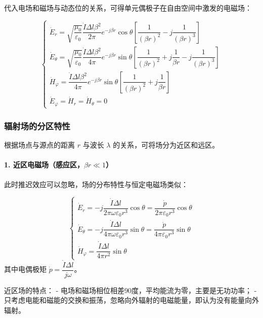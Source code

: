 代入电场和磁场与动态位的关系，可得单元偶极子在自由空间中激发的电磁场：
\begin{formulaBox}
\[
\begin{cases}
\dot{E}_r = \sqrt{\dfrac{\mu_0}{\varepsilon_0}} \dfrac{\dot{I} \Delta l \beta^2}{2\pi} e^{-j\beta r} \cos\theta \left[ \dfrac{1}{(\beta r)^2} - j\dfrac{1}{(\beta r)^3} \right] \\[6pt]
\dot{E}_\theta = \sqrt{\dfrac{\mu_0}{\varepsilon_0}} \dfrac{\dot{I} \Delta l \beta^2}{4\pi} e^{-j\beta r} \sin\theta \left[ \dfrac{1}{(\beta r)^2} + j\dfrac{1}{\beta r} - j\dfrac{1}{(\beta r)^3} \right] \\[6pt]
\dot{H}_\varphi = \dfrac{\dot{I} \Delta l \beta^2}{4\pi} e^{-j\beta r} \sin\theta \left[ \dfrac{1}{(\beta r)^2} + j\dfrac{1}{\beta r} \right] \\[6pt]
\dot{E}_\varphi = \dot{H}_r = \dot{H}_\theta = 0
\end{cases}
\]
\end{formulaBox}

\subsubsection{辐射场的分区特性}
根据场点与源点的距离 $r$ 与波长 $\lambda$ 的关系，可将场分为近区和远区。

\paragraph{1. 近区电磁场（感应区，$\beta r \ll 1$）}
此时推迟效应可以忽略，场的分布特性与恒定电磁场类似：
\begin{formulaBox}
\[
\begin{cases}
\dot{E}_r = -j\dfrac{\dot{I} \Delta l}{2\pi\omega\varepsilon_0 r^3} \cos\theta = \dfrac{\dot{p}}{2\pi\varepsilon_0 r^3} \cos\theta \\[6pt]
\dot{E}_\theta = -j\dfrac{\dot{I} \Delta l}{4\pi\omega\varepsilon_0 r^3} \sin\theta = \dfrac{\dot{p}}{4\pi\varepsilon_0 r^3} \sin\theta \\[6pt]
\dot{H}_\varphi = \dfrac{\dot{I} \Delta l}{4\pi r^2} \sin\theta
\end{cases}
\]
其中电偶极矩 $\dot{p} = \dfrac{\dot{I} \Delta l}{j\omega}$。
\end{formulaBox}

近区场的特点：
- 电场和磁场相位相差90度，平均能流为零，主要是无功功率；
- 只考虑电能和磁能的交换和振荡，忽略向外辐射的电磁能量，即认为没有能量向外辐射。

